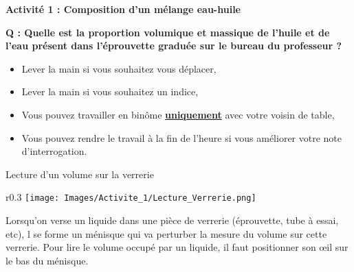 \renewcommand{\thesubsection}{\textcolor{red}{\Roman{section}.\arabic{subsection}}}
\renewcommand{\thesubsubsection}{\textcolor{red}{\Roman{section}.\arabic{subsection}.\alph{subsubsection}}}

\setcounter{section}{0}
\setcounter{document}{0}
\sndEnTeteActUn

\begin{center}
\begin{mdframed}[style=titr, leftmargin=60pt, rightmargin=60pt, innertopmargin=7pt, innerbottommargin=7pt, innerrightmargin=8pt, innerleftmargin=8pt]

\begin{center}
\large{\textbf{Activité 1 : Composition d'un mélange eau-huile}}
\end{center}

\end{mdframed}
\end{center}
\begin{Large}{\textbf{Q : Quelle est la proportion volumique et massique de l'huile et de l'eau présent dans l'éprouvette graduée sur le bureau du professeur ?}} \end{Large} 
\begin{mdframed}[style=autreexo]
\textbf{}
\begin{itemize}
    \item Lever la main si vous souhaitez vous déplacer,
    \item Lever la main si vous souhaitez un indice,
    \item Vous pouvez travailler en binôme \textbf{\underline{uniquement}} avec votre voisin de table,
    \item Vous pouvez rendre le travail à la fin de l'heure si vous améliorer votre note d'interrogation.
   
\end{itemize}
\end{mdframed}

\begin{doc}{Lecture d'un volume sur la verrerie}

\begin{wrapfigure}{r}{0.3\textwidth}
\vspace{-2cm}
    \centering
      \texttt{[image: Images/Activite\_1/Lecture\_Verrerie.png]}
  \end{wrapfigure}
  Lorsqu'on verse un liquide dans une pièce de verrerie (éprouvette, tube à essai, etc), l se forme un ménisque qui va perturber la mesure du volume sur cette verrerie. Pour lire le volume occupé par un liquide, il faut positionner son \oe il sur le bas du ménisque.%
\end{doc}

